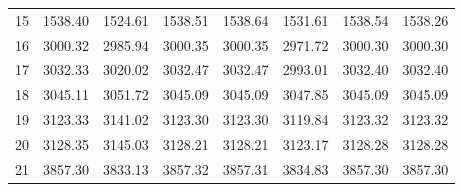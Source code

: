 \documentclass[10pt,oneside]{article}
\begin{document}
\begin{table}[h!]
\begin{tabular}{cccccccc}
15 &   1538.40 & 1524.61 & 1538.51 &    1538.64 &      1531.61 & 1538.54 &   1538.26 \\
16 &   3000.32 & 2985.94 & 3000.35 &    3000.35 &      2971.72 & 3000.30 &   3000.30 \\
17 &   3032.33 & 3020.02 & 3032.47 &    3032.47 &      2993.01 & 3032.40 &   3032.40 \\
18 &   3045.11 & 3051.72 & 3045.09 &    3045.09 &      3047.85 & 3045.09 &   3045.09 \\
19 &   3123.33 & 3141.02 & 3123.30 &    3123.30 &      3119.84 & 3123.32 &   3123.32 \\
20 &   3128.35 & 3145.03 & 3128.21 &    3128.21 &      3123.17 & 3128.28 &   3128.28 \\
21 &   3857.30 & 3833.13 & 3857.32 &    3857.31 &      3834.83 & 3857.30 &   3857.30 \\
\bottomrule
\end{tabular}
\end{table}
\end{document}
